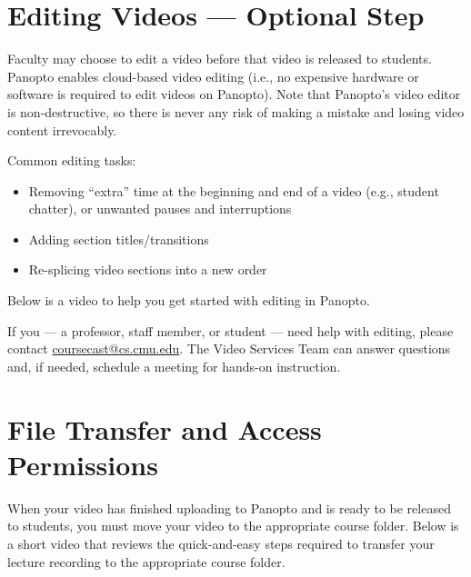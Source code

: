 \section{Editing Videos --- Optional Step}
\label{sec:panopto:editing_videos}

Faculty may choose to edit a video before that video is released to students. Panopto enables cloud-based video editing (i.e., no expensive hardware or software is required to edit videos on Panopto). Note that Panopto’s video editor is non-destructive, so there is never any risk of making a mistake and losing video content irrevocably.

Common editing tasks:
\begin{itemize}
	\item Removing ``extra'' time at the beginning and end of a video (e.g., student chatter), or unwanted pauses and interruptions
	\item Adding section titles/transitions
	\item Re-splicing video sections into a new order
\end{itemize}

\begin{gram}[Tutorial]
	Below is a video to help you get started with editing in Panopto.


	\begin{note}
		If you --- a professor, staff member, or student --- need help with editing, please contact \href{mailto:coursecast@cs.cmu.edu}{coursecast@cs.cmu.edu}. The Video Services Team can answer questions and, if needed, schedule a meeting for hands-on instruction.
	\end{note}
\end{gram}


\section{File Transfer and Access Permissions}
\label{sec:panopto:file_transfer_and_access_permissions}

\begin{gram}
	When your video has finished uploading to Panopto and is ready to be released to students, you must move your video to the appropriate course folder. Below is a short video that reviews the quick-and-easy steps required to transfer your lecture recording to the appropriate course folder.

\end{gram}

